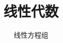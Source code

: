 \documentclass[9pt,notheorems]{beamer}
\begin{document}
\title{线性代数}
\subtitle{线性方程组}


\begin{frame}[plain]\transboxout
\titlepage
\end{frame}

\begin{frame}[allowframebreaks]\transboxin
\begin{center}
\tableofcontents[hideallsubsections]
\end{center}
\end{frame}







\end{document}
